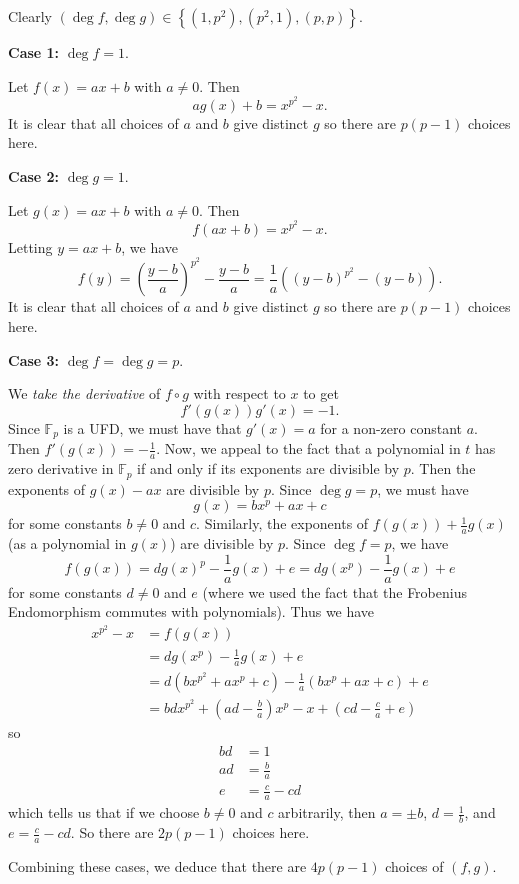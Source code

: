 Clearly $\left(\deg f,\deg g\right)\in\left\{\left(1,p^2\right),\left(p^2,1\right),\left(p,p\right)\right\}$.

\textbf{Case 1:} $\deg f=1$.

Let $f\left(x\right)=ax+b$ with $a\neq0$. Then \[ag\left(x\right)+b=x^{p^2}-x.\] It is clear that all choices of $a$ and $b$ give distinct $g$ so there are $p\left(p-1\right)$ choices here.

\textbf{Case 2:} $\deg g=1$.

Let $g\left(x\right)=ax+b$ with $a\neq0$. Then \[f\left(ax+b\right)=x^{p^2}-x.\] Letting $y=ax+b$, we have \[f\left(y\right)=\left(\frac{y-b}{a}\right)^{p^2}-\frac{y-b}{a}=\frac{1}{a}\left(\left(y-b\right)^{p^2}-\left(y-b\right)\right).\] It is clear that all choices of $a$ and $b$ give distinct $g$ so there are $p\left(p-1\right)$ choices here.

\textbf{Case 3:} $\deg f=\deg g=p$.

We \emph{take the derivative} of $f\circ g$ with respect to $x$ to get \[f'\left(g\left(x\right)\right)g'\left(x\right)=-1.\] Since $\mathbb{F}_p$ is a UFD, we must have that $g'\left(x\right)=a$ for a non-zero constant $a$. Then $f'\left(g\left(x\right)\right)=-\frac{1}{a}$. Now, we appeal to the fact that a polynomial in $t$ has zero derivative in $\mathbb{F}_p$ if and only if its exponents are divisible by $p$. Then the exponents of $g\left(x\right)-ax$ are divisible by $p$. Since $\deg g=p$, we must have \[g\left(x\right)=bx^p+ax+c\] for some constants $b\neq0$ and $c$. Similarly, the exponents of $f\left(g\left(x\right)\right)+\frac{1}{a}g(x)$ (as a polynomial in $g\left(x\right)$) are divisible by $p$. Since $\deg f=p$, we have \[f\left(g\left(x\right)\right)=dg\left(x\right)^p-\frac{1}{a}g\left(x\right)+e=dg\left(x^p\right)-\frac{1}{a}g\left(x\right)+e\] for some constants $d\neq0$ and $e$ (where we used the fact that the Frobenius Endomorphism commutes with polynomials). Thus we have
\begin{align*}
	x^{p^2}-x&=f\left(g\left(x\right)\right)\\
	&=dg\left(x^p\right)-\frac{1}{a}g\left(x\right)+e\\
	&=d\left(bx^{p^2}+ax^p+c\right)-\frac{1}{a}\left(bx^p+ax+c\right)+e\\
	&=bdx^{p^2}+\left(ad-\frac{b}{a}\right)x^p-x+\left(cd-\frac{c}{a}+e\right)
\end{align*}
so
\begin{align*}
	bd&=1\\
	ad&=\frac{b}{a}\\
	e&=\frac{c}{a}-cd
\end{align*}
which tells us that if we choose $b\neq0$ and $c$ arbitrarily, then $a=\pm b$, $d=\frac{1}{b}$, and $e=\frac{c}{a}-cd$. So there are $2p\left(p-1\right)$ choices here.

Combining these cases, we deduce that there are $\boxed{4p\left(p-1\right)}$ choices of $\left(f,g\right)$.